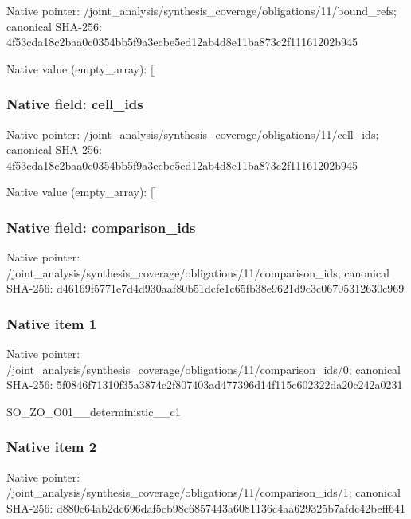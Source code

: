 \documentclass[10pt,a4paper]{article}
\begin{document}
Native pointer: /joint\_analysis/synthesi\allowbreak{}s\_coverage/obligations/1\allowbreak{}1/bound\_refs; canonical SHA-256: 4f53cda18c2baa0c0354bb5f\allowbreak{}9a3ecbe5ed12ab4d8e11ba87\allowbreak{}3c2f11161202b945



Native value (empty\_array): []



\subsubsection{Native field: cell\_ids}


Native pointer: /joint\_analysis/synthesi\allowbreak{}s\_coverage/obligations/1\allowbreak{}1/cell\_ids; canonical SHA-256: 4f53cda18c2baa0c0354bb5f\allowbreak{}9a3ecbe5ed12ab4d8e11ba87\allowbreak{}3c2f11161202b945



Native value (empty\_array): []



\subsubsection{Native field: comparison\_ids}


Native pointer: /joint\_analysis/synthesi\allowbreak{}s\_coverage/obligations/1\allowbreak{}1/comparison\_ids; canonical SHA-256: d46169f5771e7d4d930aaf80\allowbreak{}b51dcfe1c65fb38e9621d9c3\allowbreak{}c06705312630c969



\subsubsection{Native item 1}


Native pointer: /joint\_analysis/synthesi\allowbreak{}s\_coverage/obligations/1\allowbreak{}1/comparison\_ids/0; canonical SHA-256: 5f0846f71310f35a3874c2f8\allowbreak{}07403ad477396d14f115c602\allowbreak{}322da20c242a0231


SO\_ZO\_O01\_\_deterministic\_\_c1


\subsubsection{Native item 2}


Native pointer: /joint\_analysis/synthesi\allowbreak{}s\_coverage/obligations/1\allowbreak{}1/comparison\_ids/1; canonical SHA-256: d880c64ab2dc696daf5cb98c\allowbreak{}6857443a6081136c4aa62932\allowbreak{}5b7afdc42beff641
\end{document}
